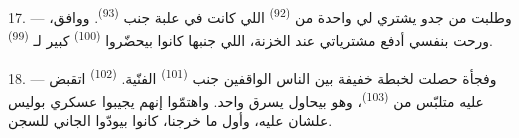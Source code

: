 \VUsaut{4.4mm}
\VUsaut{2.8mm}

17. --- وطلبت من جدو يشتري لي واحدة من  \textsuperscript{(92)}
اللي كانت في علبة جنب  \textsuperscript{(93)}. ووافق، ورحت بنفسي
أدفع مشترياتي عند الخزنة، اللي جنبها كانوا بيحضّروا 
\textsuperscript{(100)} كبير لـ \textsuperscript{(99)}.

18. --- وفجأة حصلت لخبطة خفيفة بين الناس الواقفين جنب 
\textsuperscript{(101)} الفنّية.  \textsuperscript{(102)} اتقبض عليه
متلبّس من  \textsuperscript{(103)}، وهو بيحاول يسرق واحد. واهتمّوا
إنهم يجيبوا عسكري بوليس علشان  عليه، وأول ما خرجنا، كانوا بيودّوا
الجاني للسجن.

\VUsaut{6.0mm}
\VUfilet{22mm}
